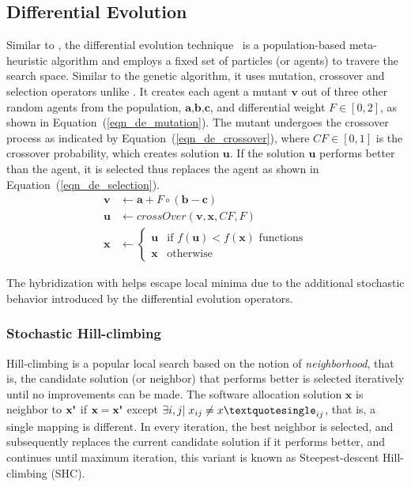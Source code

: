 \subsection{Differential Evolution}
Similar to \pso{}, the differential evolution technique~\cite{Storn1997DifferentialSpaces,Das2016RecentSurvey} is a population-based meta-heuristic algorithm and employs a fixed set of particles (or agents) to travere the search space. Similar to the genetic algorithm, it uses mutation, crossover and selection operators unlike \pso{}. It creates each agent \ttx a mutant $\textbf{v}$ out of three other random agents from the population, $\textbf{a,b,c}$, and differential weight $F\in[0,2]$, as shown in Equation~(\ref{eqn_de_mutation}). The mutant undergoes the crossover process as indicated by Equation~(\ref{eqn_de_crossover}), where $CF\in[0,1]$ is the crossover probability, which creates solution $\textbf{u}$. If the solution $\textbf{u}$ performs better than the agent, it is selected thus replaces the agent \ttx as shown in Equation~(\ref{eqn_de_selection}).
\begin{align}
    \label{eqn_de_mutation}
    \textbf{v} & \leftarrow   \textbf{a} + F\circ(\textbf{b}-\textbf{c})\\
    \label{eqn_de_crossover}
    \textbf{u}&\leftarrow crossOver(\textbf{v},\textbf{x},CF,F)\\
    \label{eqn_de_selection}
    \textbf{x} &\leftarrow 
    \begin{cases}
    \textbf{u} & \mbox{if } f(\textbf{u}) < f(\textbf{x})\mbox{ functions}\\
    \textbf{x} & \mbox{otherwise }
    \end{cases}
\end{align}

The hybridization with \de{} helps \pso{} escape local minima due to the additional stochastic behavior introduced by the differential evolution operators.

\subsubsection{Stochastic Hill-climbing \pso}
Hill-climbing is a popular local search based on the notion of \textit{neighborhood}, that is, the candidate solution (or neighbor) that performs better is selected iteratively until no improvements can be made. The software allocation solution $\textbf{x}$ is neighbor to $\textbf{x\textquotesingle}$ if $\textbf{x}=\textbf{x\textquotesingle}$ except $\exists i,j|\;x_{ij}\neq x\textquotesingle_{ij}$, that is, a single mapping is different. In every iteration, the best neighbor is selected, and subsequently replaces the current candidate solution if it performs better, and continues until maximum iteration, this variant is known as Steepest-descent Hill-climbing (SHC).

